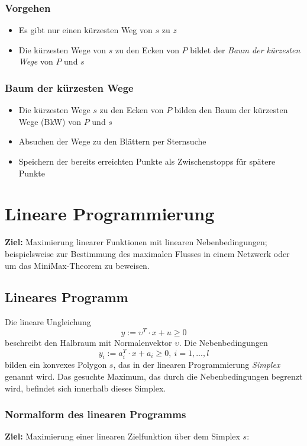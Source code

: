 \subsubsection{Vorgehen}
\begin{itemize}
	\item Es gibt nur einen kürzesten Weg von \(s\) zu \(z\)
	\item Die kürzesten Wege von \(s\) zu den Ecken von \(P\) bildet der \textit{Baum der kürzesten Wege} von \(P\) und \(s\)
\end{itemize}

\subsubsection{Baum der kürzesten Wege}
\begin{itemize}
	\item Die kürzesten Wege \(s\) zu den Ecken von \(P\) bilden den Baum der kürzesten Wege (BkW) von \(P\) und \(s\)
	\item Absuchen der Wege zu den Blättern per Sternsuche
	\item Speichern der bereits erreichten Punkte als Zwischenstopps für spätere Punkte
\end{itemize}



\section{Lineare Programmierung}
\textbf{Ziel:} Maximierung linearer Funktionen mit linearen Nebenbedingungen; beispielsweise zur Bestimmung des maximalen Flusses in einem Netzwerk oder um das MiniMax-Theorem zu beweisen.

\subsection{Lineares Programm}
Die lineare Ungleichung
\[y := \upsilon^T \cdot x + u \geq 0\]
beschreibt den Halbraum mit Normalenvektor \(\upsilon\). Die Nebenbedingungen
\[y_i := a_i^T \cdot x + a_i \geq 0,~i = 1,...,l\]
bilden ein konvexes Polygon \(s\), das in der linearen Programmierung \textit{Simplex} genannt wird. Das gesuchte Maximum, das durch die Nebenbedingungen begrenzt wird, befindet sich innerhalb dieses Simplex.

\subsubsection{Normalform des linearen Programms}
\textbf{Ziel:} Maximierung einer linearen Zielfunktion über dem Simplex \(s\):

